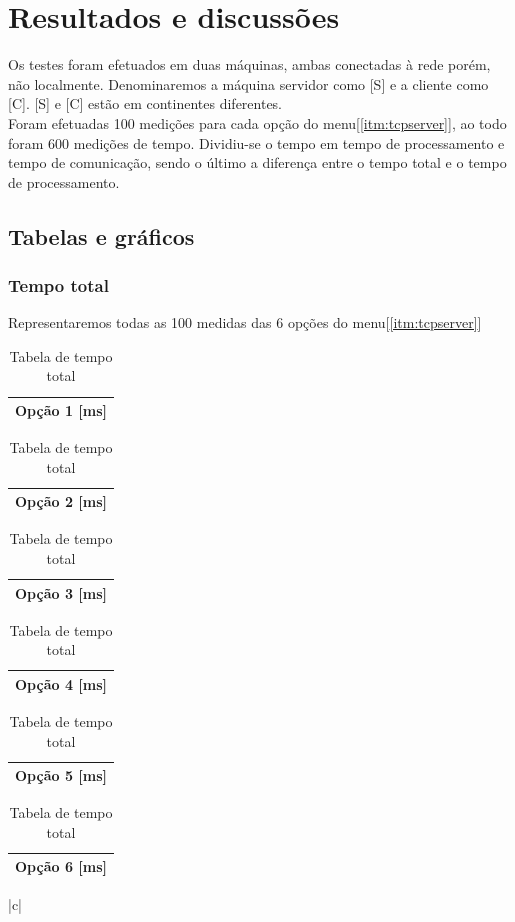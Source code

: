 \documentclass[a4paper,10pt]{article}
\begin{document}
\section{Resultados e discussões}
Os testes foram efetuados em duas máquinas, ambas conectadas à rede porém, não localmente. Denominaremos a máquina servidor como [S] e a cliente como [C]. [S] e [C] estão em continentes diferentes.
\\Foram efetuadas 100 medições para cada opção do menu[\ref{itm:tcpserver}], ao todo foram 600 medições de tempo. Dividiu-se o tempo em tempo de processamento e tempo de comunicação, sendo o último a diferença entre o tempo total e o tempo de processamento.
\subsection{Tabelas e gráficos}
\subsubsection{Tempo total}
Representaremos todas as 100 medidas das 6 opções do menu[\ref{itm:tcpserver}]
\begin{table}
  \tiny
  \centering
  \begin{tabular}{|c|}
    \hline
    Opção 1 [ms] \\
    \hline
    
  \end{tabular}
  \begin{tabular}{|c|}
    \hline
    Opção 2 [ms] \\
    \hline
    
  \end{tabular}
  \begin{tabular}{|c|}
    \hline
    Opção 3 [ms] \\
    \hline
    
  \end{tabular}
  \begin{tabular}{|c|}
    \hline
    Opção 4 [ms] \\
    \hline
    
  \end{tabular}
  \begin{tabular}{|c|}
    \hline
    Opção 5 [ms] \\
    \hline
    
  \end{tabular}
  \begin{tabular}{|c|}
    \hline
    Opção 6 [ms] \\
    \hline
    
  \end{tabular}
  \caption{Tabela de tempo total}{|c|}
\end{table}
\end{document}
